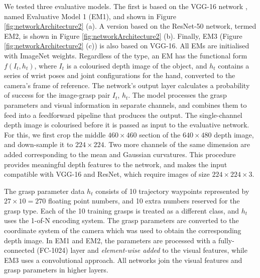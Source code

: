 We tested three evaluative models. The first is based on the VGG-16 network \cite{Simonyan14c}, named Evaluative Model 1 (EM1), and shown in Figure \ref{fig:networkArchitecture2} (a). A version based on the ResNet-50 network, termed EM2, is shown in Figure \ref{fig:networkArchitecture2} (b). Finally, EM3 (Figure \ref{fig:networkArchitecture2} (c)) is also based on VGG-16. All EMs are initialised with ImageNet weights. Regardless of the type, an EM has the functional form $f(I_t, h_t)$, where $I_t$ is a colourised depth image of the object, and $h_t$ contains a series of wrist poses and joint configurations for the hand, converted to the camera's frame of reference. The network's output layer calculates a probability of success for the image-grasp pair $I_t$, $h_t$. The model processes the grasp parameters and visual information in separate channels, and combines them to feed into a feedforward pipeline that produces the output.
The single-channel depth image is colourised before it is passed as input to the evaluative network. For this, we first crop the middle $460 \times 460$ section of the $640 \times 480$ depth image, and down-sample it to $224 \times 224$. Two more channels of the same dimension are added corresponding to the mean and Gaussian curvatures. %
This procedure provides meaningful depth features to the network, and makes the input compatible with VGG-16 and ResNet, which require images of size $224 \times 224 \times 3$.

The grasp parameter data $h_t$ consists of 10 trajectory waypoints represented by $27 \times 10 = 270$ floating point numbers, and 10 extra numbers reserved for the grasp type. Each of the 10 training grasps is treated as a different class, and $h_t$ uses the 1-of-N encoding system. The grasp parameters are converted to the coordinate system of the camera which was used to obtain the corresponding depth image. In EM1 and EM2, the parameters are processed with a fully-connected (FC-1024) layer and \textit{element-wise added} to the visual features, while EM3 uses a convolutional approach. All networks join the visual features and grasp parameters in higher layers.

